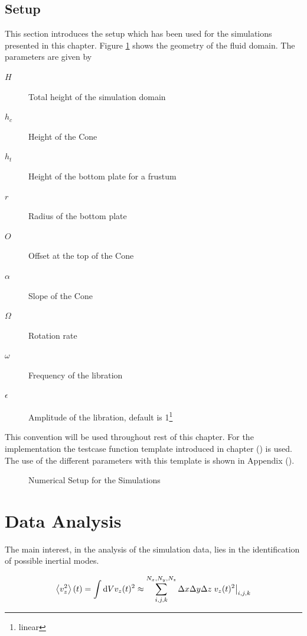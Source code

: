 \subsection{Setup}

This section introduces the setup which has been used for the simulations presented in this chapter.
Figure \ref{cone:setup_image} shows the geometry of the fluid domain. The parameters are given by

\begin{multicols}{2}
\begin{description}
    \item[$H$]{Total height of the simulation domain}
    \item[$h_c$]{Height of the Cone}
    \item[$h_t$]{Height of the bottom plate for a frustum}
    \item[$r$]{Radius of the bottom plate}
    \item[$O$]{Offset at the top of the Cone}
    \item[$\alpha$]{Slope of the Cone}
    \item[$\Omega$]{Rotation rate}
    \item[$\omega$]{Frequency of the libration}
    \item[$\epsilon$]{Amplitude of the libration, default is 1\footnote{linear}}
\end{description}
\end{multicols}

This convention will be used throughout rest of this chapter.
For the implementation the testcase function template introduced in chapter () is used.
The use of the different parameters with this template is shown in Appendix ().

\begin{figure}[!bp]
  \centering
      \caption{Numerical Setup for the Simulations \label{cone:setup_image} }
\end{figure}
\clearpage

\section{Data Analysis}

The main interest, in the analysis of the simulation data, lies in the identification of possible inertial modes.

\begin{align}
    \left<v_z^2 \right>(t) =  \int \mathop{}\!\mathrm{d} V v_z(t)^2 \approx \sum_{i, j, k}^{N_x,N_y,N_z} \Delta x \Delta y \Delta z \left.v_z(t)^2 \right|_{i,j,k}
\end{align}


